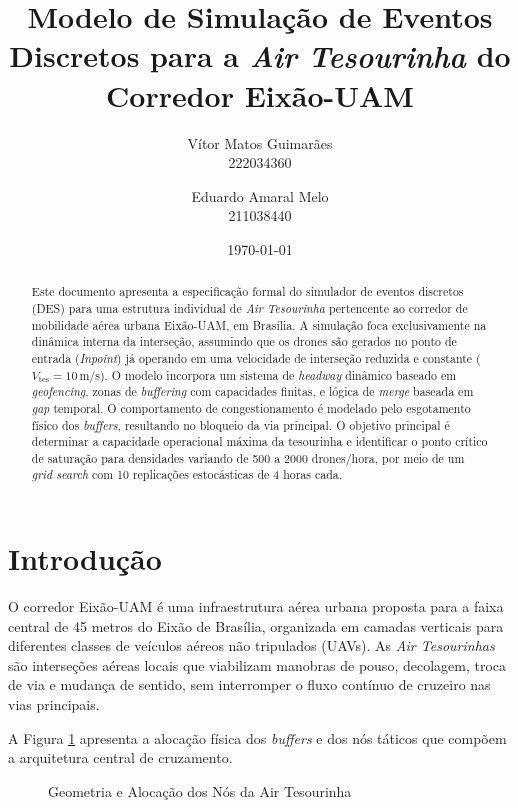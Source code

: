 \documentclass[12pt,a4paper]{article}
\title{Modelo de Simulação de Eventos Discretos para a \textit{Air Tesourinha} do Corredor Eixão-UAM}
\author{
    Vítor Matos Guimarães\\222034360
    \and
    Eduardo Amaral Melo\\211038440
}
\date{\today}
\begin{document}
\maketitle

\begin{abstract}
Este documento apresenta a especificação formal do simulador de eventos discretos (DES) para uma estrutura individual de \textit{Air Tesourinha} pertencente ao corredor de mobilidade aérea urbana Eixão-UAM, em Brasília. A simulação foca exclusivamente na dinâmica interna da interseção, assumindo que os drones são gerados no ponto de entrada (\textit{Inpoint}) já operando em uma velocidade de interseção reduzida e constante ($V_{\text{tes}} = 10$\,m/s). O modelo incorpora um sistema de \textit{headway} dinâmico baseado em \textit{geofencing}, zonas de \textit{buffering} com capacidades finitas, e lógica de \textit{merge} baseada em \textit{gap} temporal. O comportamento de congestionamento é modelado pelo esgotamento físico dos \textit{buffers}, resultando no bloqueio da via principal. O objetivo principal é determinar a capacidade operacional máxima da tesourinha e identificar o ponto crítico de saturação para densidades variando de 500 a 2000 drones/hora, por meio de um \textit{grid search} com 10 replicações estocásticas de 4 horas cada.
\end{abstract}

\tableofcontents
\newpage

\section{Introdução}

O corredor Eixão-UAM é uma infraestrutura aérea urbana proposta para a faixa central de 45 metros do Eixão de Brasília, organizada em camadas verticais para diferentes classes de veículos aéreos não tripulados (UAVs). As \textit{Air Tesourinhas} são interseções aéreas locais que viabilizam manobras de pouso, decolagem, troca de via e mudança de sentido, sem interromper o fluxo contínuo de cruzeiro nas vias principais.

A Figura \ref{fig:tesourinha} apresenta a alocação física dos \textit{buffers} e dos nós táticos que compõem a arquitetura central de cruzamento.

\begin{figure}[H]
    \centering
    \scalebox{0.85}{}
    \caption{Geometria e Alocação dos Nós da Air Tesourinha}
    \label{fig:tesourinha}
\end{figure}
\end{document}
